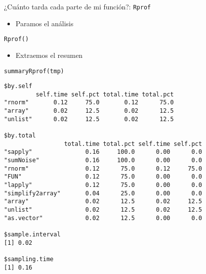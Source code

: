 \documentclass[xcolor={usenames,svgnames,dvipsnames}]{beamer}
\begin{document}
\begin{frame}[fragile,label={sec:orgheadline29}]{¿Cuánto tarda cada parte de mi función?: \texttt{Rprof}}
 \begin{itemize}
\item Paramos el análisis
\end{itemize}
\lstset{language=R,label= ,caption= ,captionpos=b,numbers=none}
\begin{lstlisting}
Rprof()
\end{lstlisting}

\begin{itemize}
\item Extraemos el resumen
\end{itemize}
\lstset{language=R,label= ,caption= ,captionpos=b,numbers=none}
\begin{lstlisting}
summaryRprof(tmp)
\end{lstlisting}

\begin{verbatim}
$by.self
         self.time self.pct total.time total.pct
"rnorm"       0.12     75.0       0.12      75.0
"array"       0.02     12.5       0.02      12.5
"unlist"      0.02     12.5       0.02      12.5

$by.total
                 total.time total.pct self.time self.pct
"sapply"               0.16     100.0      0.00      0.0
"sumNoise"             0.16     100.0      0.00      0.0
"rnorm"                0.12      75.0      0.12     75.0
"FUN"                  0.12      75.0      0.00      0.0
"lapply"               0.12      75.0      0.00      0.0
"simplify2array"       0.04      25.0      0.00      0.0
"array"                0.02      12.5      0.02     12.5
"unlist"               0.02      12.5      0.02     12.5
"as.vector"            0.02      12.5      0.00      0.0

$sample.interval
[1] 0.02

$sampling.time
[1] 0.16
\end{verbatim}
\end{frame}
\end{document}
